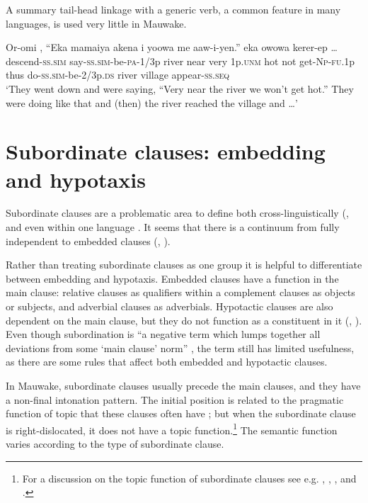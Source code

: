 A summary tail-head linkage with a generic verb, a common feature in many  languages, is used very little in Mauwake. 

\ea%
\label{ex:8:x1520}
\gll Or-omi  ,  ``Eka  mamaiya  akena i  yoowa  me  aaw-i-yen.''    eka owowa kerer-ep {\dots}\\
descend-\textsc{ss}.\textsc{sim} say-\textsc{ss}.\textsc{sim}-be-\textsc{pa}-1/3p river near very 1p.\textsc{unm} hot  not  get-\textsc{Np}-\textsc{fu}.1p thus do-\textsc{ss}.\textsc{sim}-be-2/3p.\textsc{ds} river  village  appear-\textsc{ss}.\textsc{seq}\\
\glt`They went down and were saying, ``Very near the river we won't get hot.'' They were doing like that and (then) the river reached the village and {\dots}'
\z


\section{Subordinate clauses: embedding and hypotaxis} \label{sec:8.3}

Subordinate clauses are a problematic area to define both cross-linguistically (\citealt{HaimanEtAl1984}, \citealt[317]{MathiessenEtAl1988} and even within one language \citep[848]{Givon1990}. It seems that there is a continuum from fully independent to embedded clauses (\citealt[207]{Reesink1987}, \citealt[189]{Lehmann1988}). 

Rather than treating subordinate clauses as one group it is helpful to differentiate between embedding and hypotaxis. Embedded clauses have a function in the main clause: relative clauses as qualifiers within a  complement clauses as objects or subjects, and adverbial clauses as adverbials. Hypotactic clauses are also dependent on the main clause, but they do not function as a constituent in it (\citealt[219]{Halliday1994}, \citealt{Lehmann1988}). Even though subordination is ``a negative term which lumps together all deviations from some `main clause' norm'' \citep[510]{HaimanEtAl1984}%
, the term still has limited usefulness, as there are some rules that affect both embedded and hypotactic clauses.  

In Mauwake, subordinate clauses usually precede the main clauses, and they have a non-final intonation pattern. The initial position is related to the pragmatic function of topic that these clauses often have \citep[187]{Lehmann1988}; but when the subordinate clause is right-dislocated, it does not have a topic function.\footnote{For a discussion on the topic function of subordinate clauses see e.g. \citet{Reesink1983b, Reesink1987}, \citet{MathiessenEtAl1988}, \citet{Lehmann1988}, and \citet{ThompsonEtAl2007}.}  The semantic function varies according to the type of subordinate clause. 

